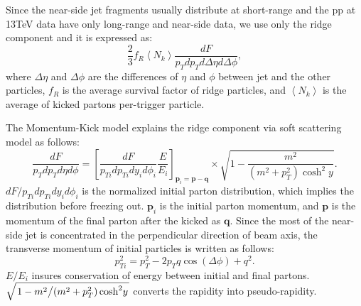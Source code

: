 \documentclass[jkps,fleqn,showpacs,showkeys]{revtex4}
\begin{document}
Since the near-side jet fragments usually distribute at short-range and the pp at 13TeV data have only long-range and near-side data, we use only the ridge component and it is expressed as:
\begin{equation} \label{equation:eq1}
\frac{2}{3} f_R\left\langle N_k\right\rangle \frac{dF}{p_T dp_T d\Delta\eta d\Delta\phi},
\end{equation}
where $\Delta \eta $ and $\Delta \phi$ are the differences of $\eta$ and $\phi$ between jet and the other particles, $f_R$ is the average survival factor of ridge particles, and $\left\langle N_k\right\rangle$ is the average of kicked partons per-trigger particle.

The Momentum-Kick model explains the ridge component via soft scattering model as follows:
\begin{equation} \label{equation:eq4}
\frac{dF}{p_Tdp_Td\eta d\phi}
= \left[\frac{dF}{p_{Ti}dp_{Ti}dy_id\phi_i} \frac{E}{E_i} \right]_{\mathbf{p}_i=\mathbf{p}-\mathbf{q}}\times\sqrt{1-\frac{m^2}{\left(m^2+p_T^2\right){\cosh}^2y}}.
\end{equation}
$ dF / p_{Ti}dp_{Ti}dy_id\phi_i $ is the normalized initial parton distribution, which implies the distribution before freezing out.
$\mathbf{p}_i$ is the initial parton momentum, and $\mathbf{p}$ is the momentum of the final parton after the kicked as $\mathbf{q}$.
Since the most of the near-side jet is concentrated in the perpendicular direction of beam axis, the transverse momentum of initial particles is written as follows:
\begin{equation} \label{equation:eq5}
p_{Ti}^2=p_{T}^2-2p_{T} q \cos\left(\Delta\phi\right)+q^2.
\end{equation}
$E/E_i$ insures conservation of energy between initial and final partons.
$\sqrt{ \left. 1- m^2 \middle/ \left(m^2+p_T^2\right){\cosh}^2y \right.}$ converts the rapidity into pseudo-rapidity.
\end{document}
